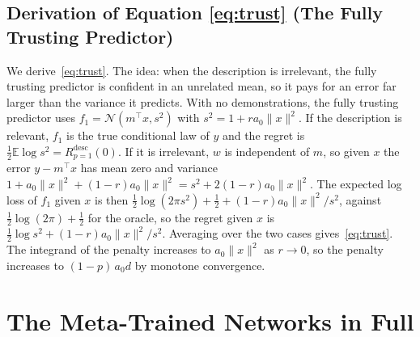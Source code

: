 \documentclass{article}
\newcommand{\E}{\mathbb{E}}
\begin{document}
\subsection{Derivation of Equation \eqref{eq:trust} (The Fully Trusting Predictor)}\label{app:trust}
We derive~\eqref{eq:trust}. The idea: when the description is irrelevant, the fully trusting predictor is confident in an unrelated mean, so it pays for an error far larger than the variance it predicts. With no demonstrations, the fully trusting predictor uses $f_1 = \mathcal{N}(m^\top x, s^2)$ with $s^2 = 1 + r a_0 \|x\|^2$. If the description is relevant, $f_1$ is the true conditional law of $y$ and the regret is $\tfrac12 \E \log s^2 = R^{\mathrm{desc}}_{p=1}(0)$. If it is irrelevant, $w$ is independent of $m$, so given $x$ the error $y - m^\top x$ has mean zero and variance $1 + a_0\|x\|^2 + (1-r)a_0\|x\|^2 = s^2 + 2(1-r)a_0\|x\|^2$. The expected log loss of $f_1$ given $x$ is then $\tfrac12 \log(2\pi s^2) + \tfrac12 + (1-r)a_0\|x\|^2/s^2$, against $\tfrac12 \log(2\pi) + \tfrac12$ for the oracle, so the regret given $x$ is $\tfrac12 \log s^2 + (1-r)a_0\|x\|^2/s^2$. Averaging over the two cases gives~\eqref{eq:trust}. The integrand of the penalty increases to $a_0\|x\|^2$ as $r \to 0$, so the penalty increases to $(1-p)\,a_0 d$ by monotone convergence.

\section{The Meta-Trained Networks in Full}\label{app:networks}
\begin{table}[!htb]
\centering\small
\caption{Networks against the reference predictors ($d=5$, $a_0=10$; $20{,}000$ evaluation prompts per network, with the standard error of its ESS), grouped by training reliability; the last group is the second seed. ``Trained'' and ``calibrated'' are the Bayes-optimal predictors with the training and the test reliability, shown once where they coincide; ``single Gaussian'' is the best predictive that a mean and a variance can express, for a network tested at its own training reliability $p < 1$. Calibrated values, and trained values where the two reliabilities coincide, use $200{,}000$ prompts (standard errors at most $0.12$); other trained values use the network's evaluation prompts, and single-Gaussian values $100{,}000$ prompts. ``Trust'' is the network's implied trust with no demonstrations, on the grid $0.001$, $0.01$, $0.05$, $0.1$, \dots, $0.95$, $0.99$, $0.999$.}
\label{tab:networks}
\vspace{3pt}

\end{table}
\end{document}
